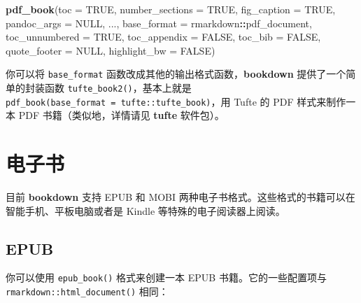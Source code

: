 \documentclass[
  12pt,
]{krantz}
\newenvironment{Shaded}{\begin{snugshade}}{\end{snugshade}}
\newcommand{\AttributeTok}[1]{\textcolor[rgb]{0.13,0.29,0.53}{#1}}
\newcommand{\ConstantTok}[1]{\textcolor[rgb]{0.56,0.35,0.01}{#1}}
\newcommand{\FunctionTok}[1]{\textcolor[rgb]{0.13,0.29,0.53}{\textbf{#1}}}
\newcommand{\NormalTok}[1]{#1}
\newcommand{\SpecialCharTok}[1]{\textcolor[rgb]{0.81,0.36,0.00}{\textbf{#1}}}
\theoremstyle{definition}
\theoremstyle{definition}
\theoremstyle{definition}
\theoremstyle{definition}
\theoremstyle{remark}
\begin{document}
\begin{Shaded}
\begin{Highlighting}[]
\FunctionTok{pdf\_book}\NormalTok{(}\AttributeTok{toc =} \ConstantTok{TRUE}\NormalTok{, }\AttributeTok{number\_sections =} \ConstantTok{TRUE}\NormalTok{,}
  \AttributeTok{fig\_caption =} \ConstantTok{TRUE}\NormalTok{, }\AttributeTok{pandoc\_args =} \ConstantTok{NULL}\NormalTok{, ...,}
  \AttributeTok{base\_format =}\NormalTok{ rmarkdown}\SpecialCharTok{::}\NormalTok{pdf\_document,}
  \AttributeTok{toc\_unnumbered =} \ConstantTok{TRUE}\NormalTok{, }\AttributeTok{toc\_appendix =} \ConstantTok{FALSE}\NormalTok{,}
  \AttributeTok{toc\_bib =} \ConstantTok{FALSE}\NormalTok{, }\AttributeTok{quote\_footer =} \ConstantTok{NULL}\NormalTok{,}
  \AttributeTok{highlight\_bw =} \ConstantTok{FALSE}\NormalTok{)}
\end{Highlighting}
\end{Shaded}

你可以将 \texttt{base\_format} 函数改成其他的输出格式函数，\textbf{bookdown} 提供了一个简单的封装函数 \texttt{tufte\_book2()}，基本上就是 \texttt{pdf\_book(base\_format\ =\ tufte::tufte\_book)}，用 Tufte 的 PDF 样式来制作一本 PDF 书籍（类似地，详情请见 \textbf{tufte} 软件包）。

\hypertarget{ux7535ux5b50ux4e66}{%
\section{电子书}\label{ux7535ux5b50ux4e66}}

目前 \textbf{bookdown} 支持 EPUB 和 MOBI 两种电子书格式。这些格式的书籍可以在智能手机、平板电脑或者是 Kindle 等特殊的电子阅读器上阅读。

\hypertarget{epub}{%
\subsection{EPUB}\label{epub}}

你可以使用 \texttt{epub\_book()} 格式来创建一本 EPUB 书籍。它的一些配置项与 \texttt{rmarkdown::html\_document()} 相同：
\end{document}
